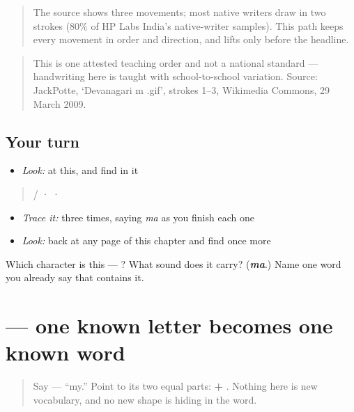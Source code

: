 \begin{quote}
The source shows three movements; most native writers draw  in two strokes (80\% of HP Labs India's native-writer samples). This path keeps every movement in order and direction, and lifts only before the headline.
\end{quote}

\begin{quote}
This is one attested teaching order and not a national standard — handwriting here is taught with school-to-school variation. Source: JackPotte, ‘Devanagari m .gif’, strokes 1–3, Wikimedia Commons, 29 March 2009.
\end{quote}

\subsection*{Your turn}
\begin{itemize}
\raggedright
  \item \emph{Look:} at this, and find  in it
\end{itemize}

\begin{quote}
 /   ·    ·  
\end{quote}

\begin{itemize}
\raggedright
  \item \emph{Trace it:}  three times, saying \emph{ma} as you finish each one
  \item \emph{Look:} back at any page of this chapter and find  once more
\end{itemize}

\begin{tcolorbox}[breakable,colback=teal!4,colframe=teal!35!black,title={Before you move on}]
Which character is this — ? What sound does it carry? (\emph{\textbf{ma}}.) Name one word you already say that contains it.
\end{tcolorbox}
\section[\texorpdfstring{\sk{मम} (mama)}{मम (mama)}]{ — one known letter becomes one known word}

\label{lesson:SA-W03-mama-guided-copy}



\begin{quote}
Say \textbf{} — “my.” Point to its two equal parts: \textbf{ + }. Nothing here is new vocabulary, and no new shape is hiding in the word.
\end{quote}

